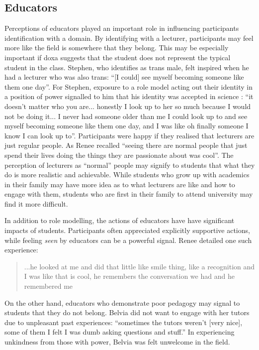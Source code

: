 \subsection{Educators}
Perceptions of educators played an important role in influencing participants identification with a domain. By identifying with a lecturer, participants may feel more like the field is somewhere that they belong. This may be especially important if doxa suggests that the student does not represent the typical student in the class. Stephen, who identifies as trans male, felt inspired when he had a lecturer who was also trans: ``[I could] see myself becoming someone like them one day''. For Stephen, exposure to a role model acting out their identity in a position of power signalled to him that his identity was accepted in science : ``it doesn't matter who you are... honestly I look up to her so much because I would not be doing it... I never had someone older than me I could look up to and see myself becoming someone like them one day, and I was like oh finally someone I know I can look up to''. Participants were happy if they realised that lecturers are just regular people. As Renee recalled ``seeing there are normal people that just spend their lives doing the things they are passionate about was cool''. The perception of lecturers as ``normal'' people may signify to students that what they do is more realistic and achievable. While students who grow up with academics in their family may have more idea as to what lecturers are like and how to engage with them, students who are first in their family to attend university may find it more difficult.  

In addition to role modelling, the actions of educators have have significant impacts of students. Participants often appreciated explicitly supportive actions, while feeling \textit{seen} by educators can be a powerful signal. Renee detailed one such experience: \blockquote{...he looked at me and did that little like smile thing, like a recognition and I was like that is cool, he remembers the conversation we had and he remembered me} On the other hand, educators who demonstrate poor pedagogy may signal to students that they do not belong. Belvia did not want to engage with her tutors due to unpleasant past experiences: ``sometimes the tutors weren't [very nice], some of them I felt I was dumb asking questions and stuff.'' In experiencing unkindness from those with power, Belvia was felt unwelcome in the field.  



